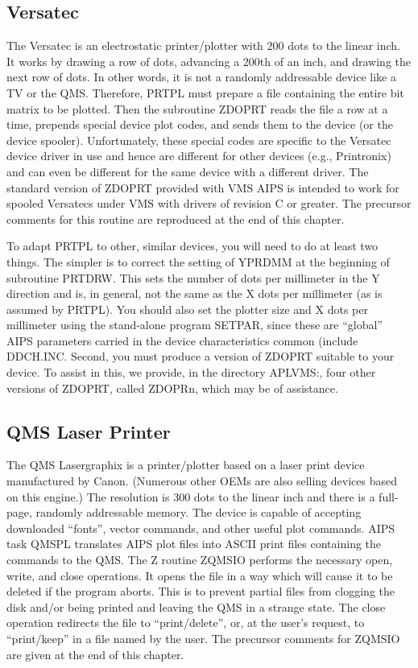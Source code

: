 \subsection{Versatec}
The Versatec is an electrostatic printer/plotter with
200 dots to the 
linear inch.  It works by drawing a row of dots, advancing a 200th of
an inch, and drawing the next row of dots.  In other words, it is not
a randomly addressable device like a TV or the QMS. Therefore, PRTPL
must prepare a file containing the entire bit matrix to be plotted.
Then the subroutine ZDOPRT reads the file a row at a time, prepends
special device plot codes, and sends them to the device (or the device
spooler).  Unfortunately, these special codes are specific to the
Versatec device driver in use and hence are different for other
devices (e.g., Printronix) and can even be different for the same
device with a different driver.  The standard version of ZDOPRT
provided with VMS AIPS is intended to work for spooled Versatecs under
VMS with drivers of revision C or greater.  The precursor comments for
this routine are reproduced at the end of this chapter.

To adapt PRTPL to other, similar devices, you will need to do at
least two things.  The simpler is to correct the setting of YPRDMM at
the beginning of subroutine PRTDRW.  This sets the number of dots per
millimeter in the Y direction and is, in general, not the same as the
X dots per millimeter (as is assumed by PRTPL).  You should also set
the plotter size and X dots per millimeter using the stand-alone
program SETPAR, since these are ``global'' AIPS parameters carried in
the device characteristics common (include DDCH.INC.
Second, you must produce a version of ZDOPRT suitable to your device.
To assist in this, we provide, in the directory APLVMS:, four other
versions of ZDOPRT, called ZDOPRn, which may be of assistance.

\subsection{QMS Laser Printer}
The QMS Lasergraphix is a printer/plotter based on a laser print
device manufactured by Canon.  (Numerous other OEMs are also selling
devices based on this engine.)  The resolution is 300 dots to the
linear inch and there is a full-page, randomly addressable memory.
The device is capable of accepting downloaded ``fonts'', vector
commands, and other useful plot commands.  AIPS task QMSPL
translates
AIPS plot files into ASCII print files containing the commands to the
QMS.  The Z routine ZQMSIO performs the necessary open, write, and
close operations.  It opens the file in a way which will cause it to
be deleted if the program aborts.  This is to prevent partial files
from clogging the disk and/or being printed and leaving the QMS in a
strange state.  The close operation redirects the file to
``print/delete'', or, at the user's request, to ``print/keep'' in a file
named by the user.  The precursor comments for ZQMSIO are given at the
end of this chapter.

